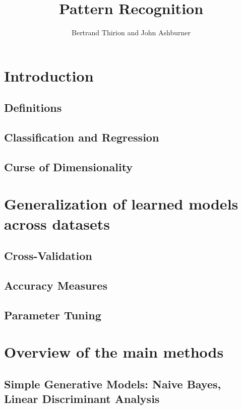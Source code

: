 \documentclass{beamer}
\title{Pattern Recognition}
\author{Bertrand Thirion and John Ashburner}
\date{}
\begin{document}
\begin{frame}
\titlepage
\end{frame}

\section{Introduction}
    \subsection{Definitions}

    \subsection{Classification and Regression}                               
    \subsection{Curse of Dimensionality}                                     
\section{Generalization of learned models across datasets}
    \subsection{Cross-Validation}                                            
    \subsection{Accuracy Measures}                                           
    \subsection{Parameter Tuning}                                            
\section{Overview of the main methods}

    \subsection{Simple Generative Models: Naive Bayes, Linear Discriminant Analysis}       
\end{document}
